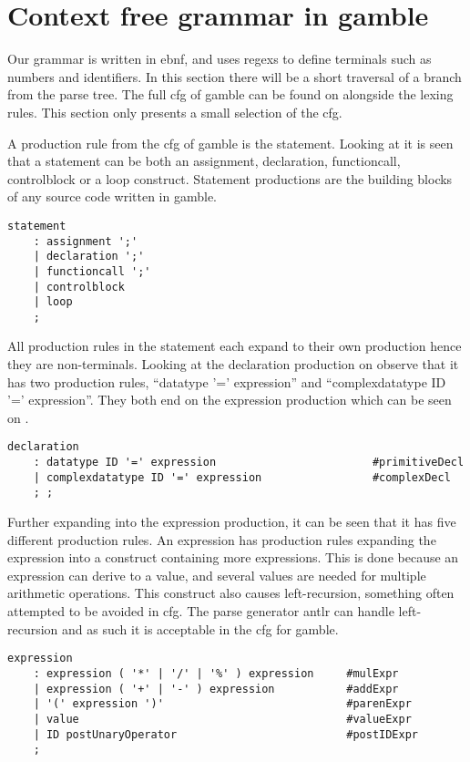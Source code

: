 \section{Context free grammar in \gls{gamble}}
Our grammar is written in \acrfull{ebnf}, and uses \acrfull{regex}s to define terminals such as numbers and identifiers.
In this section there will be a short traversal of a branch from the parse tree.
The full \acrshort{cfg} of \gls{gamble} can be found on  alongside the lexing rules.
This section only presents a small selection of the \acrshort{cfg}.

A production rule from the \acrshort{cfg} of \gls{gamble} is the statement. 
Looking at  it is seen that a statement can be both an assignment, declaration, functioncall, controlblock or a loop construct. 
Statement productions are the building blocks of any source code written in \gls{gamble}.

\begin{lstlisting}[caption={\acrshort{cfg} Statement},frame=tlrb,label={lst:statements},numbers=none]
statement
    : assignment ';'
    | declaration ';'
    | functioncall ';'
    | controlblock
    | loop
    ;
\end{lstlisting}

All production rules in the statement each expand to their own production hence they are non-terminals.
Looking at the declaration production on  observe that it has two production rules, ``datatype '=' expression'' and ``complexdatatype ID '=' expression''. 
They both end on the expression production which can be seen on .

\begin{lstlisting}[caption={\acrshort{cfg} Declaration},frame=tlrb,label={lst:declaration},numbers=none]
declaration
    : datatype ID '=' expression                        #primitiveDecl
    | complexdatatype ID '=' expression                 #complexDecl
    ; ;
\end{lstlisting}

Further expanding into the expression production, it can be seen that it has five different production rules.
An expression has production rules expanding the expression into a construct containing more expressions.
This is done because an expression can derive to a value, and several values are needed for multiple arithmetic operations.
This construct also causes left-recursion, something often attempted to be avoided in \acrshort{cfg}.
The parse generator \acrshort{antlr} can handle left-recursion and as such it is acceptable in the \acrshort{cfg} for \gls{gamble}.
\begin{lstlisting}[caption={\acrshort{cfg} Expression},frame=tlrb,label={lst:expression},numbers=none]
expression
    : expression ( '*' | '/' | '%' ) expression     #mulExpr
    | expression ( '+' | '-' ) expression           #addExpr
    | '(' expression ')'                            #parenExpr
    | value                                         #valueExpr
    | ID postUnaryOperator                          #postIDExpr
    ;
\end{lstlisting}
  
